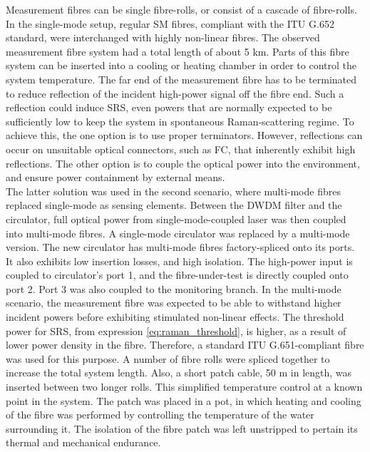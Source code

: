 \documentclass{standalone}
\begin{document}
Measurement fibres can be single fibre-rolls, or consist of a cascade of fibre-rolls. In the single-mode setup, regular SM fibres, compliant with the ITU G.652 standard, were interchanged with highly non-linear fibres. The observed measurement fibre system had a total length of about 5 km. Parts of this fibre system can be inserted into a cooling or heating chamber in order to control the system temperature. The far end of the measurement fibre has to be terminated to reduce reflection of the incident high-power signal off the fibre end. Such a reflection could induce SRS, even powers that are normally expected to be sufficiently low to keep the system in spontaneous Raman-scattering regime. To achieve this, the one option is to use proper terminators. However, reflections can occur on unsuitable optical connectors, such as FC, that inherently exhibit high reflections. The other option is to couple the optical power into the environment, and ensure power containment by external means. \\

The latter solution was used in the second scenario, where multi-mode fibres replaced single-mode as sensing elements. Between the DWDM filter and the circulator, full optical power from single-mode-coupled laser was then coupled into multi-mode fibres. A single-mode circulator was replaced by a multi-mode version. The new circulator has multi-mode fibres factory-spliced onto its ports. It also exhibits low insertion losses, and high isolation. The high-power input is coupled to circulator's port 1, and the fibre-under-test is directly coupled onto port 2. Port 3 was also coupled to the monitoring branch. In the multi-mode scenario, the measurement fibre was expected to be able to withstand higher incident powers before exhibiting stimulated non-linear effects. The threshold power for SRS, from expression \ref{eq:raman_threshold}, is higher, as a result of lower power density in the fibre. Therefore, a standard ITU G.651-compliant fibre was used for this purpose. A number of fibre rolls were spliced together to increase the total system length. Also, a short patch cable, 50 m in length, was inserted between two longer rolls. This simplified temperature control at a known point in the system. The patch was placed in a pot, in which heating and cooling of the fibre was performed by controlling the temperature of the water surrounding it. The isolation of the fibre patch was left unstripped to pertain its thermal and mechanical endurance. \\
\end{document}
